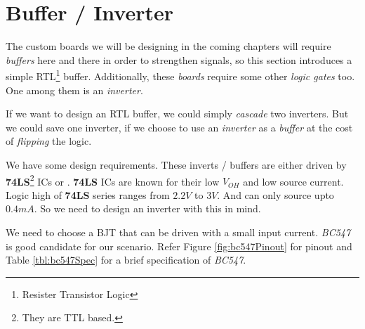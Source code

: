 \documentclass[../../main]{subfiles}
\begin{document}
\section{Buffer / Inverter} \label{sec:}

The custom boards we will be designing in the coming chapters will require \emph{buffers}
here and there in order to strengthen signals, so this section introduces a simple
RTL\footnote{Resister Transistor Logic} buffer. Additionally, these \emph{boards} require
some other \emph{logic gates} too. One among them is an \emph{inverter}.

If we want to design an RTL buffer, we could simply \emph{cascade} two inverters. But we
could save one inverter, if we choose to use an \emph{inverter} as a \emph{buffer} at
the cost of \emph{flipping} the logic.


We have some design requirements. These inverts / buffers are either driven by
\textbf{74LS}\footnote{They are TTL based.} ICs or \esp. \textbf{74LS} ICs are known
for their low $\si{V}_{OH}$ and low source current. Logic high of \textbf{74LS} series ranges
from $2.2\si{V}$ to $3\si{V}$. And can only source upto $0.4\si{mA}$. So we need to
design an inverter with this in mind.

We need to choose a BJT that can be driven with a small input current. \emph{BC547} is
good candidate for our scenario. Refer Figure \ref{fig:bc547Pinout} for pinout and Table
\ref{tbl:bc547Spec} for a brief specification of \emph{BC547}.
\end{document}
